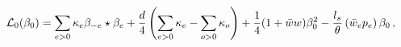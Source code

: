 \begin{equation}
\mathcal{L}_{0}(\beta _{0})=\sum_{e>0}\kappa _{e}\beta _{-e}\star \beta _{e}+%
\frac{d}{4}\left( \sum_{e>0}\kappa _{e}-\sum_{o>0}\kappa _{o}\right) +{\frac{%
1}{4}}(1+\bar{w}w)\beta _{0}^{2}-{\frac{l_{s}}{\theta }}\left( \bar{w}%
_{e}p_{e}\right) \beta _{0}\,,
\end{equation}

